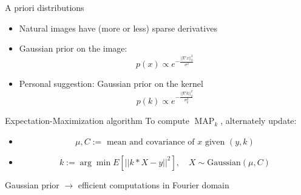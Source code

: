\documentclass{beamer}
\DeclareMathOperator{\MAP}{MAP}
\begin{document}
\begin{frame}{A priori distributions}
\begin{itemize}
	\item Natural images have (more or less) sparse derivatives
	\item Gaussian prior on the image: 
	\[
	p(x) \propto e^{-\frac{||\nabla x||_2^2}{\sigma^2}}
	\]
	\item Personal suggestion: Gaussian prior on the kernel
	\[
	p(k) \propto e^{-\frac{||\nabla k||_2^2}{\sigma_k^2}}
	\]
\end{itemize}
\end{frame}

\begin{frame}{Expectation-Maximization algorithm}
To compute $\MAP_{k}$, alternately update:
\begin{itemize}
	\item \[\mu,C := \text{ mean and covariance of } x \text{ given } (y,k)\]
	\item \[k := \arg \min E\left[||k*X - y||^2\right], \quad X\sim\text{Gaussian}(\mu,C) \]
\end{itemize}
\pause
Gaussian prior $\longrightarrow$ efficient computations in Fourier domain
\end{frame}
\end{document}
